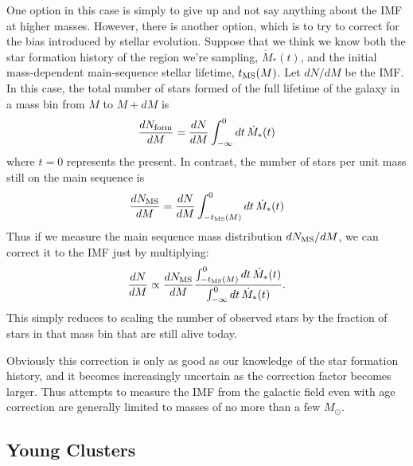 One option in this case is simply to give up and not say anything about the IMF at higher masses. However, there is another option, which is to try to correct for the bias introduced by stellar evolution. Suppose that we think we know both the star formation history of the region we're sampling, $\dot{M}_*(t)$, and the initial mass-dependent main-sequence stellar lifetime, $t_{\rm MS}(M)$. Let $dN/dM$ be the IMF. In this case, the total number of stars formed of the full lifetime of the galaxy in a mass bin from $M$ to $M+dM$ is
\begin{equation}
\frac{dN_{\rm form}}{dM} =  \frac{dN}{dM} \int_{-\infty}^0 dt \, \dot{M}_*(t)
\end{equation}
where $t=0$ represents the present. In contrast, the number of stars per unit mass still on the main sequence is
\begin{equation}
\frac{dN_{\rm MS}}{dM} = \frac{dN}{dM} \int_{-t_{\rm MS}(M)}^0 dt \, \dot{M}_*(t)
\end{equation}
Thus if we measure the main sequence mass distribution $dN_{\rm MS}/dM$, we can correct it to the IMF just by multiplying:
\begin{equation}
\frac{dN}{dM} \propto \frac{dN_{\rm MS}}{dM} \frac{\int_{-t_{\rm MS}(M)}^0 dt \, \dot{M}_*(t)}{\int_{-\infty}^0 dt \, \dot{M}_*(t)}.
\end{equation}
This simply reduces to scaling the number of observed stars by the fraction of stars in that mass bin that are still alive today.

Obviously this correction is only as good as our knowledge of the star formation history, and it becomes increasingly uncertain as the correction factor becomes larger. Thus attempts to measure the IMF from the galactic field even with age correction are generally limited to masses of no more than a few $M_\odot$.

\subsection{Young Clusters}

